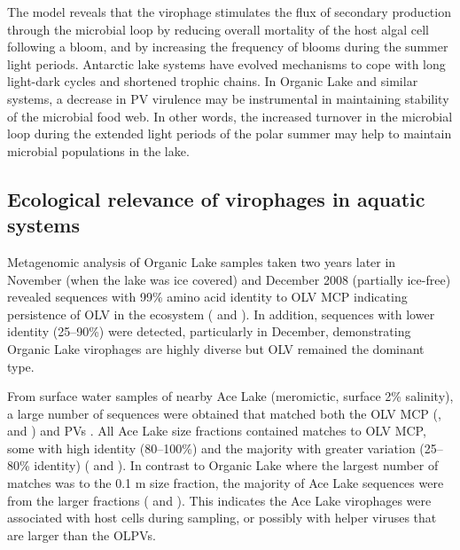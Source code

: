 The model reveals that the virophage stimulates the flux of secondary production through the microbial loop by reducing overall mortality of the host algal cell following a bloom, and by increasing the frequency of blooms during the summer light periods. 
Antarctic lake systems have evolved mechanisms to cope with long light-dark cycles \cite{Lauro2011} and shortened trophic chains. 
In Organic Lake and similar systems, a decrease in \ac{PV} virulence may be instrumental in maintaining stability of the microbial food web. 
In other words, the increased turnover in the microbial loop during the extended light periods of the polar summer may help to maintain microbial populations in the lake.

\subsection{Ecological relevance of virophages in aquatic systems}
Metagenomic analysis of Organic Lake samples taken two years later in November (when the lake was ice covered) and December 2008 (partially ice-free) revealed sequences with 99\% amino acid identity to \ac{OLV} \ac{MCP} indicating persistence of \ac{OLV} in the ecosystem ( and ). 
In addition, sequences with lower identity (25--90\%) were detected, particularly in December, demonstrating Organic Lake virophages are highly diverse but \ac{OLV} remained the dominant type. 



From surface water samples of nearby Ace Lake (meromictic, surface 2\% salinity), a large number of sequences were obtained that matched both the \ac{OLV} \ac{MCP} (,  and ) and \acp{PV} \cite{Lauro2011}. %
All Ace Lake size fractions contained matches to \ac{OLV} \ac{MCP}, some with high identity (80--100\%) and the majority with greater variation (25--80\% identity) ( and ). 
In contrast to Organic Lake where the largest number of matches was to the 0.1 \textmu{}m size fraction, the majority of Ace Lake sequences were from the larger fractions ( and ). 
This indicates the Ace Lake virophages were associated with host cells during sampling, or possibly with helper viruses that are larger than the \acp{OLPV}. 


